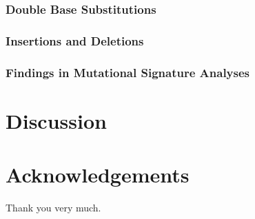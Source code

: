 \documentclass[11pt,a4paper,onecolumn,oneside]{report}
\begin{document}
            \subsubsection{Double Base Substitutions}

            \subsubsection{Insertions and Deletions}

            \subsubsection{Findings in Mutational Signature Analyses}

    \newpage

    \section{Discussion}
    \newpage

    
    
    \newpage

    \section*{\hfill \Large Acknowledgements \hfill}
        Thank you very much.
    \newpage

    \hbox{}
    \thispagestyle{empty}
    \clearpage
\end{document}
